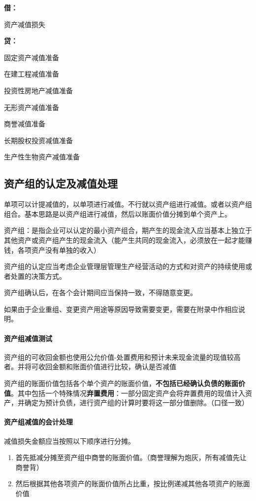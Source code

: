 \documentclass[UTF8,12pt]{ctexart}
\newenvironment{Dr}{%
	\begin{list}{}%
		{
			\setlength{\leftmargin}{2em}
			\setlength{\labelwidth}{2em}
			\setlength{\labelsep}{0pt}
			\setlength{\itemindent}{0pt}
			\setlength{\listparindent}{0pt}
			\setlength{\parsep}{0pt}
			\setlength{\topsep}{0pt}
		}
		\item[\textbf{借：}]
	}{%
	\end{list}
}
\newenvironment{Cr}{%
	\begin{list}{}%
		{
			\setlength{\leftmargin}{2em}
			\setlength{\labelwidth}{2em}
			\setlength{\labelsep}{0pt}
			\setlength{\itemindent}{0pt}
			\setlength{\listparindent}{0pt}
			\setlength{\parsep}{0pt}
			\setlength{\topsep}{0pt}
		}
		\item[\textbf{贷：}]
	}{%
	\end{list}
}
\numberwithin{equation}{section} %
\numberwithin{figure}{section}
\numberwithin{table}{section}
\begin{document}
	\begin{Dr}
		资产减值损失
	\end{Dr}
	\begin{Cr}
		固定资产减值准备
		
		在建工程减值准备
		
		投资性房地产减值准备
		
		无形资产减值准备
		
		商誉减值准备
		
		长期股权投资减值准备
		
		生产性生物资产减值准备
	\end{Cr}
	
	
	\subsection{资产组的认定及减值处理}
	单项可以计提减值的，以单项进行减值。不行就以资产组进行减值。或者以资产组组合。基本思路是以资产组进行减值，然后以账面价值分摊到单个资产上。
	
	资产组：是指企业可以认定的最小资产组合，期产生的现金流入应当基本上独立于其他资产或资产组产生的现金流入（能产生共同的现金流入，必须放在一起才能赚钱，各项资产没有单独的收入）
	
	资产组的认定应当考虑企业管理层管理生产经营活动的方式和对资产的持续使用或者处置的决策方式。
	
	资产组确认后，在各个会计期间应当保持一致，不得随意变更。
	
	如果由于企业重组、变更资产用途等原因导致需要变更，需要在附录中作相应说明。
	
	\paragraph{资产组减值测试} 资产组的可收回金额也使用公允价值-处置费用和预计未来现金流量的现值较高者。并将可收回金额和账面价值进行比较，确认是否减值
	
	资产组的账面价值包括各个单个资产的账面价值，\textbf{不包括已经确认负债的账面价值}。其中包括一个特殊情况\textbf{弃置费用}：一部分固定资产会将弃置费用的现值计入资产，并确定为预计负债，进行资产组的计算时要将这一部分值删除。（口径一致）
	
	\paragraph{资产组减值的会计处理}
	减值损失金额应当按照以下顺序进行分摊。
	\begin{enumerate}
		\item 首先抵减分摊至资产组中商誉的账面价值。（商誉理解为炮灰，所有减值先让商誉背）
		
		\item 然后根据其他各项资产的账面价值所占比重，按比例递减其他各项资产的账面价值
	\end{enumerate}
	
\end{document}
